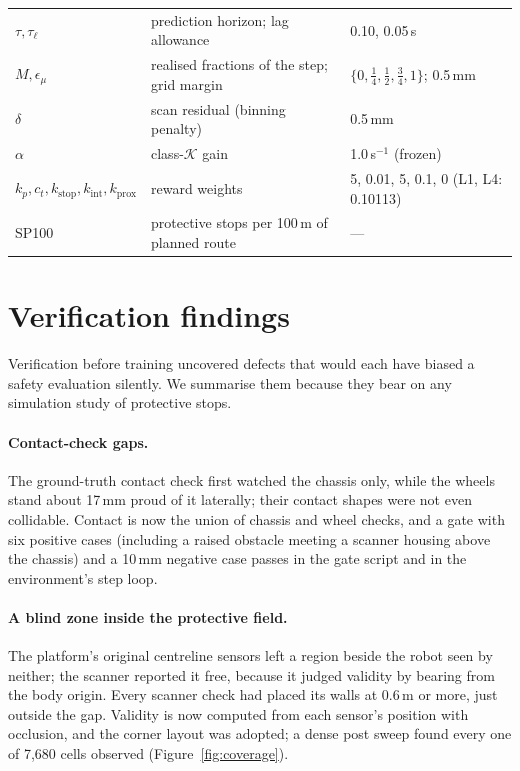 \documentclass[11pt]{article}
\theoremstyle{definition}
\begin{document}
\begin{table}[h]
\begin{tabularx}{\textwidth}{lXl}
$\tau,\tau_\ell$ & prediction horizon; lag allowance & 0.10, 0.05\,s\\
$M,\epsilon_\mu$ & realised fractions of the step; grid margin & $\{0,\frac14,\frac12,\frac34,1\}$; 0.5\,mm\\
$\delta$ & scan residual (binning penalty) & 0.5\,mm\\
$\alpha$ & class-$\mathcal{K}$ gain & 1.0\,s$^{-1}$ (frozen)\\
$k_p,c_t,k_{\mathrm{stop}},k_{\mathrm{int}},k_{\mathrm{prox}}$ & reward weights & 5, 0.01, 5, 0.1, 0 (L1, L4: 0.10113)\\
SP100 & protective stops per 100\,m of planned route & ---\\
\bottomrule
\end{tabularx}
\end{table}

\section{Verification findings}\label{app:verification}
Verification before training uncovered defects that would each have biased a safety evaluation silently.
We summarise them because they bear on any simulation study of protective stops.

\paragraph{Contact-check gaps.} The ground-truth contact check first watched the chassis only, while the
wheels stand about 17\,mm proud of it laterally; their contact shapes were not even collidable. Contact is
now the union of chassis and wheel checks, and a gate with six positive cases (including a raised obstacle
meeting a scanner housing above the chassis) and a 10\,mm negative case passes in the gate script and in
the environment's step loop.

\paragraph{A blind zone inside the protective field.} The platform's original centreline sensors left a
region beside the robot seen by neither; the scanner reported it free, because it judged validity by
bearing from the body origin. Every scanner check had placed its walls at 0.6\,m or more, just outside the
gap. Validity is now computed from each sensor's position with occlusion, and the corner layout was
adopted; a dense post sweep found every one of 7{,}680 cells observed (Figure~\ref{fig:coverage}).
\end{document}
